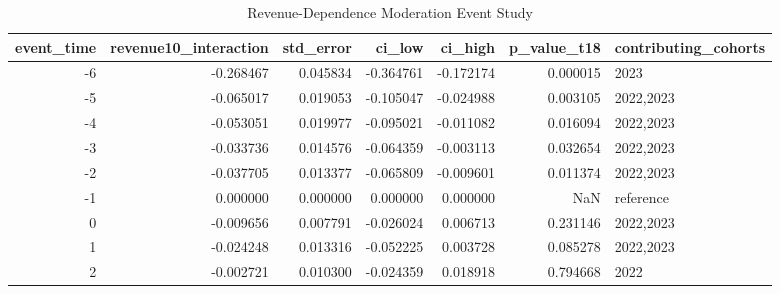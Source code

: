 \begin{table}
\caption{Revenue-Dependence Moderation Event Study}
\label{tab:table2_event_study_gate}
\begin{tabular}{rrrrrrl}
\toprule
event_time & revenue10_interaction & std_error & ci_low & ci_high & p_value_t18 & contributing_cohorts \\
\midrule
-6 & -0.268467 & 0.045834 & -0.364761 & -0.172174 & 0.000015 & 2023 \\
-5 & -0.065017 & 0.019053 & -0.105047 & -0.024988 & 0.003105 & 2022,2023 \\
-4 & -0.053051 & 0.019977 & -0.095021 & -0.011082 & 0.016094 & 2022,2023 \\
-3 & -0.033736 & 0.014576 & -0.064359 & -0.003113 & 0.032654 & 2022,2023 \\
-2 & -0.037705 & 0.013377 & -0.065809 & -0.009601 & 0.011374 & 2022,2023 \\
-1 & 0.000000 & 0.000000 & 0.000000 & 0.000000 & NaN & reference \\
0 & -0.009656 & 0.007791 & -0.026024 & 0.006713 & 0.231146 & 2022,2023 \\
1 & -0.024248 & 0.013316 & -0.052225 & 0.003728 & 0.085278 & 2022,2023 \\
2 & -0.002721 & 0.010300 & -0.024359 & 0.018918 & 0.794668 & 2022 \\
\bottomrule
\end{tabular}
\end{table}
